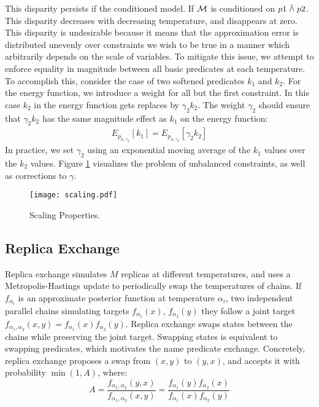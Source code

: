 This disparity persists if the conditioned model.
If ${\mathcal{M}}$ is conditioned on $p1 \mathrel{\tilde{\land}} p2$.
This disparity  decreases with decreasing temperature, and disappears at zero.
This disparity is undesirable because it means that the approximation error is distributed unevenly over constraints we wish to be true in a manner which arbitrarily depends on the scale of variables.
To mitigate this issue, we attempt to enforce equality
in magnitude between all basic predicates at each temperature.
To accomplish this, consider the case of two 
softened predicates $k_1$ and $k_2$. For the
energy function, we introduce a weight
for all but the first constraint.
In this case $k_2$ in the energy function gets replaces
by $\gamma_2 k_2$. The weight $\gamma_2$ should
ensure that $\gamma_2 k_2$ has the same
magnitude effect as $k_1$ on the energy
function:
\begin{align*}
E_{p_{\alpha, \gamma_2}}[k_1] = E_{p_{\alpha, \gamma_2}}[\gamma_2 k_2] 
\end{align*}
In practice, we set $\gamma_2$ using an exponential moving
average of the $k_1$ values over the $k_2$ values.
Figure \ref{scaling} visualizes the problem of unbalanced constraints, as well as corrections to $\gamma$.


\begin{figure}
  \centering
  \texttt{[image: scaling.pdf]}
  \caption{Scaling Properties.}\label{scaling}
  \end{figure}

  
\subsection{Replica Exchange}\label{replicaexchange}
Replica exchange \citep{swendsen1986replica} simulates $M$ replicas at different temperatures, and uses a Metropolis-Hastings update to  periodically swap the temperatures of chains.
If $f_{\alpha_i}$ is an approximate posterior function at temperature $\alpha_i$, two independent parallel chains simulating targets $f_{\alpha_1}(x)$, $f_{\alpha_2}(y)$ they follow a joint target $f_{\alpha_1, \alpha_2}(x,y) = f_{\alpha_1}(x)f_{\alpha_2}(y)$.
Replica exchange swaps states between the chains while preserving the joint target.
Swapping states is equivalent to swapping predicates, which motivates the name predicate exchange.
Concretely, replica exchange proposes a swap from $(x, y)$ to $(y, x)$, and accepts it with probability $\min(1, A)$, where:
\begin{equation}
A =  \frac{f_{\alpha_1, \alpha_2}(y,x)}{f_{\alpha_1, \alpha_2}(x,y)} = \frac{f_{\alpha_1}(y)f_{\alpha_2}(x)}{f_{\alpha_1}(x)f_{\alpha_2}(y)}
\end{equation}


